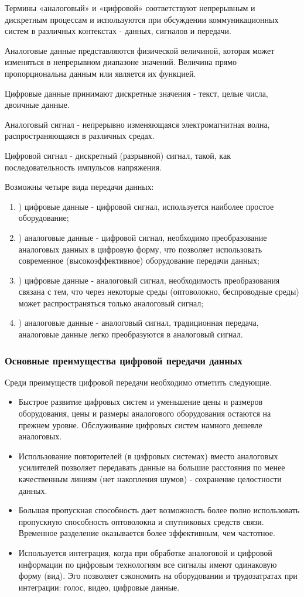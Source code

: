 \documentclass[a4paper]{report}
\begin{document}
Термины «аналоговый» и «цифровой» соответствуют непрерывным и дискретным процессам и используются при обсуждении коммуникационных систем в различных контекстах - данных, сигналов и передачи.

Аналоговые данные представляются физической величиной, которая может изменяться в непрерывном диапазоне значений. Величина прямо пропорциональна данным или является их функцией.

Цифровые данные принимают дискретные значения - текст, целые числа, двоичные данные.

Аналоговый сигнал - непрерывно изменяющаяся электромагнитная волна, распространяющаяся в различных средах.

Цифровой сигнал - дискретный (разрывной) сигнал, такой, как последовательность импульсов напряжения.

Возможны четыре вида передачи данных:
\begin{enumerate}
\item) цифровые данные - цифровой сигнал, используется наиболее простое оборудование;
\item) аналоговые данные - цифровой сигнал, необходимо преобразование аналоговых данных в цифровую форму, что позволяет использовать современное (высокоэффективное) оборудование передачи данных;
\item) цифровые данные - аналоговый сигнал, необходимость преобразования связана с тем, что через некоторые среды (оптоволокно, беспроводные среды) может распространяться только аналоговый сигнал;
\item) аналоговые данные - аналоговый сигнал, традиционная передача, аналоговые данные легко преобразуются в аналоговый сигнал.
\end{enumerate}
\subsubsection{Основные преимущества цифровой передачи данных}
Среди преимуществ цифровой передачи необходимо отметить следующие.
\begin{itemize}
\item \qquad Быстрое развитие цифровых систем и уменьшение цены и размеров оборудования, цены и размеры аналогового оборудования остаются на прежнем уровне. Обслуживание цифровых систем намного дешевле аналоговых.
\item \qquad Использование повторителей (в цифровых системах) вместо аналоговых усилителей позволяет передавать данные на большие расстояния по менее качественным линиям (нет накопления шумов) - сохранение целостности данных.
\item \qquad Большая пропускная способность дает возможность более полно использовать пропускную способность оптоволокна и спутниковых средств связи. Временное разделение оказывается более эффективным, чем частотное.
\item \qquad Используется интеграция, когда при обработке аналоговой и цифровой информации по цифровым технологиям все сигналы имеют одинаковую форму (вид). Эго позволяет сэкономить на оборудовании и трудозатратах при интеграции: голос, видео, цифровые данные.
\end{itemize}
\end{document}
